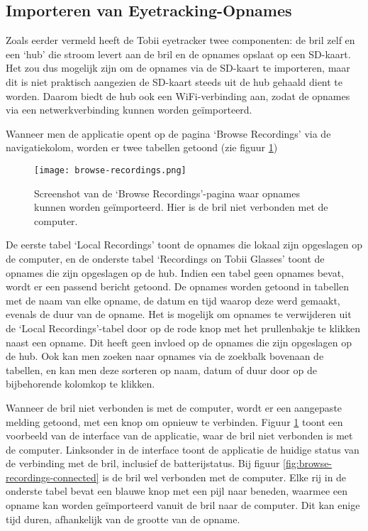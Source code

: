 \subsection{Importeren van Eyetracking-Opnames}

Zoals eerder vermeld heeft de Tobii eyetracker twee componenten: de bril zelf en een `hub' die stroom levert aan de bril en de opnames opslaat op een SD-kaart.
Het zou dus mogelijk zijn om de opnames via de SD-kaart te importeren, maar dit is niet praktisch aangezien de SD-kaart steeds uit de hub gehaald dient te worden.
Daarom biedt de hub ook een WiFi-verbinding aan, zodat de opnames via een netwerkverbinding kunnen worden geïmporteerd. 

Wanneer men de applicatie opent op de pagina `Browse Recordings' via de navigatiekolom, worden er twee tabellen getoond (zie figuur \ref{fig:browse-recordings})

\begin{figure}[H]
  \centering
  \texttt{[image: browse-recordings.png]}
  \caption[
  Screenshot van de `Browse Recordings'-pagina
  ]{\label{fig:browse-recordings} Screenshot van de `Browse Recordings'-pagina waar opnames kunnen worden geïmporteerd. Hier is de bril niet verbonden met de computer. }
\end{figure}


De eerste tabel `Local Recordings' toont de opnames die lokaal zijn opgeslagen op de computer, en de onderste tabel `Recordings on Tobii Glasses' toont de opnames die zijn opgeslagen op de hub.
Indien een tabel geen opnames bevat, wordt er een passend bericht getoond.
De opnames worden getoond in tabellen met de naam van elke opname, de datum en tijd waarop deze werd gemaakt, evenals de duur van de opname. 
Het is mogelijk om opnames te verwijderen uit de `Local Recordings'-tabel door op de rode knop met het prullenbakje te klikken naast een opname. Dit heeft geen invloed op de opnames die zijn opgeslagen op de hub.
Ook kan men zoeken naar opnames via de zoekbalk bovenaan de tabellen, en kan men deze sorteren op naam, datum of duur door op de bijbehorende kolomkop te klikken.

Wanneer de bril niet verbonden is met de computer, wordt er een aangepaste melding getoond, met een knop om opnieuw te verbinden. Figuur \ref{fig:browse-recordings} toont een voorbeeld van de interface van de applicatie, waar de bril niet verbonden is met de computer.
Linksonder in de interface toont de applicatie de huidige status van de verbinding met de bril, inclusief de batterijstatus. Bij figuur \ref{fig:browse-recordings-connected} is de bril wel verbonden met de computer. 
Elke rij in de onderste tabel bevat een blauwe knop met een pijl naar beneden, waarmee een opname kan worden geïmporteerd vanuit de bril naar de computer. Dit kan enige tijd duren, afhankelijk van de grootte van de opname.

